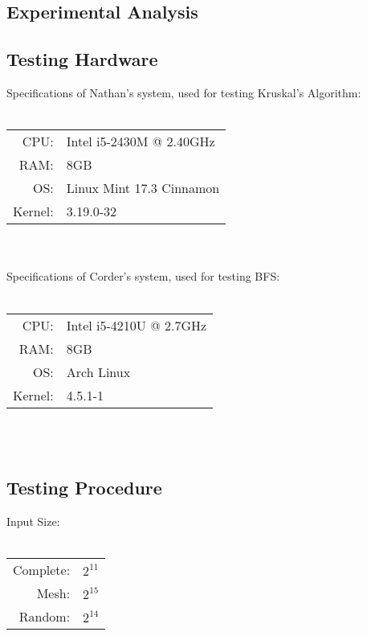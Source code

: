 \documentclass[titlepage]{article}
\begin{document}
\begin{multicols*}{2}
        \section{Experimental Analysis}
            \subsection{Testing Hardware}
                Specifications of Nathan's system, used for testing Kruskal's Algorithm: \\ \\
                \begin{tabular}{r l}
                CPU:    & Intel i5-2430M @ 2.40GHz \\
                RAM:    & 8GB \\
                OS:     & Linux Mint 17.3 Cinnamon \\
                Kernel: & 3.19.0-32 \\
                \end{tabular} \\ \\
                \noindent
                Specifications of Corder's system, used for testing BFS: \\ \\
                \begin{tabular}{r l}
                CPU:    & Intel i5-4210U @ 2.7GHz \\
                RAM:    & 8GB \\
                OS:     & Arch Linux \\
                Kernel: & 4.5.1-1 \\
                \end{tabular} \\ \\

            \subsection{Testing Procedure}
                Input Size: \\ \\
                \begin{tabular}{r l}
                Complete:   & $2^{11}$ \\
                Mesh:       & $2^{15}$ \\
                Random:     & $2^{14}$ \\
                \end{tabular}


\end{multicols*}
\end{document}
